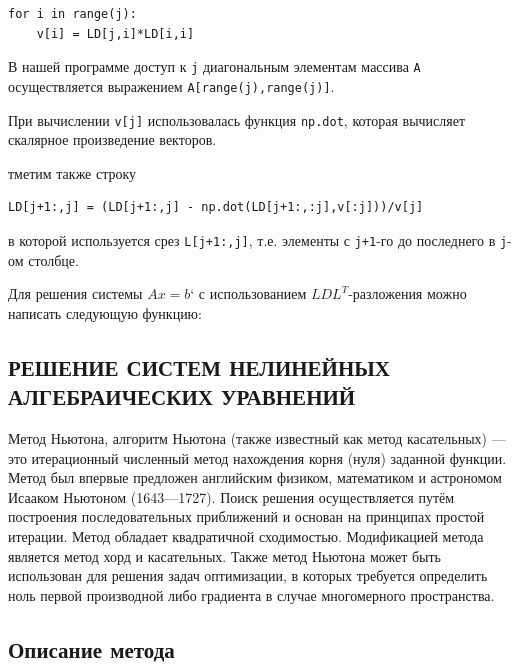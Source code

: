 \documentclass[a4paper]{article}
\begin{document}
\begin{verbatim}
for i in range(j):
    v[i] = LD[j,i]*LD[i,i]
\end{verbatim}

В нашей программе доступ к \texttt{j} диагональным элементам массива
\texttt{A} осуществляется выражением \texttt{A{[}range(j),range(j){]}}.

При вычислении \texttt{v{[}j{]}} использовалась функция \texttt{np.dot},
которая вычисляет скалярное произведение векторов.

тметим также строку

\begin{verbatim}
LD[j+1:,j] = (LD[j+1:,j] - np.dot(LD[j+1:,:j],v[:j]))/v[j]
\end{verbatim}

в которой используется срез \texttt{L{[}j+1:,j{]}}, т.е. элементы с
\texttt{j+1}-го до последнего в \texttt{j}-ом столбце.

Для решения системы \(Ax = b\)` с использованием \(LDL^T\)-разложения
можно написать следующую функцию:




\newpage

\begin{center}
 \section{РЕШЕНИЕ СИСТЕМ НЕЛИНЕЙНЫХ АЛГЕБРАИЧЕСКИХ УРАВНЕНИЙ}
\end{center}

Метод Ньютона, алгоритм Ньютона (также известный как метод касательных) — это итерационный численный метод нахождения корня (нуля) заданной функции. Метод был впервые предложен английским физиком, математиком и астрономом Исааком Ньютоном (1643—1727). Поиск решения осуществляется путём построения последовательных приближений и основан на принципах простой итерации. Метод обладает квадратичной сходимостью. Модификацией метода является метод хорд и касательных. Также метод Ньютона может быть использован для решения задач оптимизации, в которых требуется определить ноль первой производной либо градиента в случае многомерного пространства.

\subsection{Описание метода}
\end{document}
